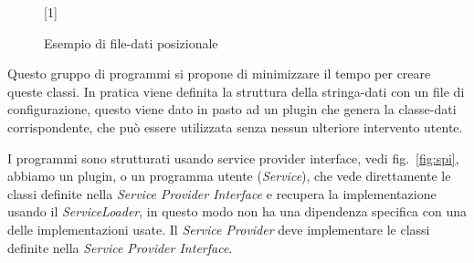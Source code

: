 \begin{figure}[!htb]
\scalebox{0.7}[1]{
\texttt{%
\fbox[lb]{ }%
\fbox[lb]{ }%
\fbox[lb]{ }%
\fbox[lb]{ }%
\fbox[lb]{ }%
\fbox[lb]{ }%
\fbox[lb]{ }%
\fbox[lb]{ }%
\fbox[lb]{ }%
\fbox[lb]{ }%
\fbox[lb]{ }%
\fbox[lb]{ }%
\fbox[lb]{ }%
\fbox[lb]{ }%
\fbox[lb]{ }%
\fbox[lb]{ }%
\fbox[lb]{ }%
\fbox[lb]{ }%
\fbox[lb]{ }%
\fbox[lb]{ }%
\fbox[lb]{ }%
\fbox[lb]{ }%
\fbox[lb]{ }%
\fbox[lb]{ }%
\fbox[lb]{ }%
\fbox[lb]{ }%
\fbox[lb]{ }%
\fbox[lb]{ }%
}}

\caption{Esempio di file-dati posizionale} 
\label{fig:str.data}
\end{figure}



Questo gruppo di programmi si propone di minimizzare il tempo per creare queste
classi. In pratica viene definita la struttura della stringa-dati con un file di
configurazione, questo viene dato in pasto ad un plugin che genera la 
classe-dati corrispondente, che può essere utilizzata senza nessun ulteriore
intervento utente.

I programmi sono strutturati usando service provider interface, 
vedi fig.~\ref{fig:spi}, abbiamo un plugin, o un programma utente 
(\textsl{Service}), che vede direttamente le classi definite nella 
\textsl{Service Provider Interface} e recupera la implementazione usando il 
\textsl{ServiceLoader}, in questo modo non ha una dipendenza specifica con una
delle implementazioni usate. 
Il \textsl{Service Provider} deve implementare le classi definite nella 
\textsl{Service Provider Interface}.


